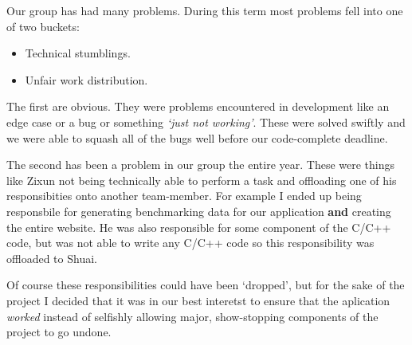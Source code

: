 Our group has had many problems.
During this term most problems fell into one of two buckets:

\begin{itemize}
  \item Technical stumblings.
  \item Unfair work distribution.
\end{itemize}

The first are obvious.
They were problems encountered in development like an edge case or a bug or something \textit{`just not working'}.
These were solved swiftly and we were able to squash all of the bugs well before our code-complete deadline.

The second has been a problem in our group the entire year.
These were things like Zixun not being technically able to perform a task and offloading one of his responsibities onto another team-member.
For example I ended up being responsbile for generating benchmarking data for our application \textbf{and} creating the entire website.
He was also responsible for some component of the C/C++ code, but was not able to write any C/C++ code so this responsibility was offloaded to Shuai.

Of course these responsibilities could have been `dropped', but for the sake of the project I decided that it was in our best interetst to ensure that the aplication \textit{worked} instead of selfishly allowing major, show-stopping components of the project to go undone.

